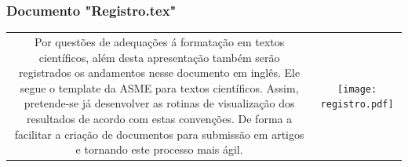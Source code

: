 \documentclass[xcolor=dvipsnames,10pt,aspectratio=169]{beamer}
\begin{document}
	\begin{frame}
		\frametitle{Documento "Registro.tex"}
		\begin{tabular}{c c}
			{
				\begin{minipage}[h!]{0.4\textwidth}
					\centering
					\small
					Por questões de adequações á formatação em textos científicos, além desta apresentação também serão registrados os andamentos nesse documento em inglês. Ele segue o template da ASME para textos científicos. Assim, pretende-se já desenvolver as rotinas de visualização dos resultados de acordo com estas convenções. De forma a facilitar a criação de documentos para submissão em artigos e tornando este processo mais ágil.
					\vspace{6cm}
				\end{minipage}
			}&{
				\texttt{[image: registro.pdf]}
			}	
		\end{tabular}
	
	\end{frame}
\end{document}
